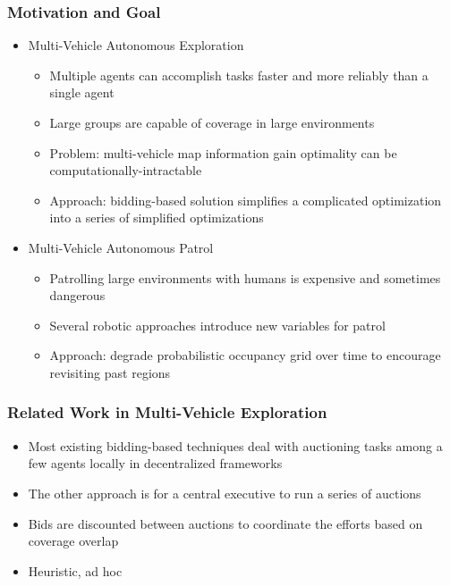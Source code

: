 \documentclass[11pt,professionalfonts,hyperref={pdftex,pdfpagemode=none,pdfstartview=FitH}]{beamer}
\begin{document}
\begin{frame}
\frametitle{Motivation and Goal}

\begin{itemize}
	\item Multi-Vehicle Autonomous Exploration
	\begin{itemize}
		\item Multiple agents can accomplish tasks faster and more reliably than a single agent
		\item Large groups are capable of coverage in large environments
		\item Problem: multi-vehicle map information gain optimality can be computationally-intractable
		\item Approach: bidding-based solution simplifies a complicated optimization into a series of simplified optimizations
	\end{itemize}
	\pause
	\item Multi-Vehicle Autonomous Patrol
	\begin{itemize}
		\item Patrolling large environments with humans is expensive and sometimes dangerous
		\item Several robotic approaches introduce new variables for patrol
		\item Approach: degrade probabilistic occupancy grid over time to encourage revisiting past regions
	\end{itemize}
\end{itemize}

\end{frame}

\begin{frame}
\frametitle{Related Work in Multi-Vehicle Exploration}

\begin{itemize}
	\item Most existing bidding-based techniques deal with auctioning tasks among a few agents locally in decentralized frameworks
	\item The other approach is for a central executive to run a series of auctions
	\item Bids are discounted between auctions to coordinate the efforts based on coverage overlap
	\item Heuristic, ad hoc
\end{itemize}

\end{frame}
\end{document}
